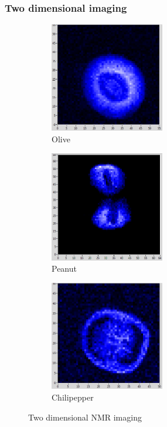 \subsubsection{Two dimensional imaging}
\begin{figure}[ht]
\begin{subfigure}{.3\textwidth}
\includegraphics[width=5cm]{..//figures//olive.png}
\caption{Olive}
\end{subfigure}
\qquad
\begin{subfigure}{.3\textwidth}
\includegraphics[width=5cm]{..//figures//peanut.png}
\caption{Peanut}
\end{subfigure}
\qquad
\begin{subfigure}{.3\textwidth}
\includegraphics[width=5cm]{..//figures//chilipepper.png}
\caption{Chilipepper}
\end{subfigure}
\caption{Two dimensional NMR imaging}
\label{fig:2d}
\end{figure}